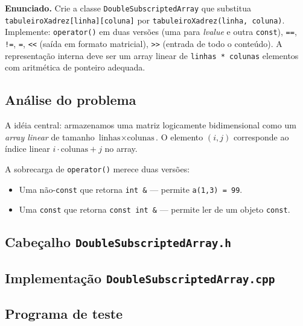 \documentclass[11pt,a4paper]{article}
\begin{document}
\begin{enunciado}
\textbf{Enunciado.} Crie a classe \texttt{DoubleSubscriptedArray} que substitua \texttt{tabuleiroXadrez[linha][coluna]} por \texttt{tabuleiroXadrez(linha, coluna)}. Implemente: \texttt{operator()} em duas vers\~oes (uma para \emph{lvalue} e outra \texttt{const}), \texttt{==}, \texttt{!=}, \texttt{=}, \texttt{<<} (sa\'ida em formato matricial), \texttt{>>} (entrada de todo o conte\'udo). A representa\c{c}\~ao interna deve ser um array linear de \texttt{linhas * colunas} elementos com aritm\'etica de ponteiro adequada.
\end{enunciado}

\subsection*{An\'alise do problema}

A id\'eia central: armazenamos uma matriz logicamente bidimensional como um \emph{array linear} de tamanho $\text{linhas} \times \text{colunas}$. O elemento $(i, j)$ corresponde ao \'indice linear $i \cdot \text{colunas} + j$ no array.

A sobrecarga de \texttt{operator()} merece duas vers\~oes:

\begin{itemize}[leftmargin=*,itemsep=0pt]
  \item Uma n\~ao-\texttt{const} que retorna \texttt{int \&} --- permite \texttt{a(1,3) = 99}.
  \item Uma \texttt{const} que retorna \texttt{const int \&} --- permite ler de um objeto \texttt{const}.
\end{itemize}

\subsection*{Cabe\c{c}alho \texttt{DoubleSubscriptedArray.h}}



\subsection*{Implementa\c{c}\~ao \texttt{DoubleSubscriptedArray.cpp}}



\subsection*{Programa de teste}
\end{document}
